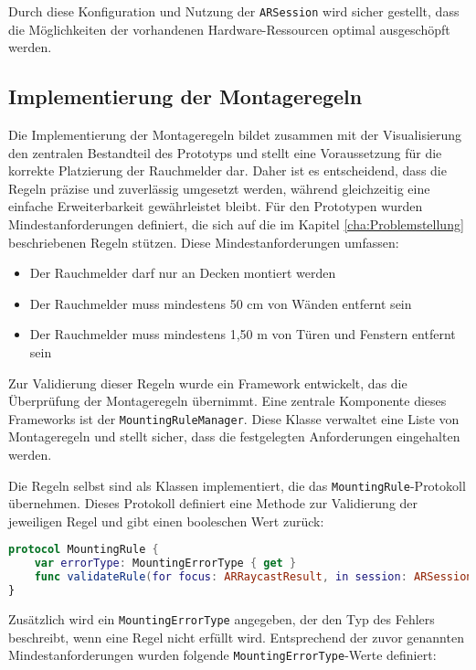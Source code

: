 Durch diese Konfiguration und Nutzung der \texttt{ARSession} wird sicher gestellt, dass die Möglichkeiten der vorhandenen Hardware-Ressourcen optimal ausgeschöpft werden.

\subsection{Implementierung der Montageregeln}\label{sec:ImplMontageregeln}

Die Implementierung der Montageregeln bildet zusammen mit der Visualisierung den zentralen Bestandteil des Prototyps und stellt eine Voraussetzung für die korrekte Platzierung der Rauchmelder dar. Daher ist es entscheidend, dass die Regeln präzise und zuverlässig umgesetzt werden, während gleichzeitig eine einfache Erweiterbarkeit gewährleistet bleibt. Für den Prototypen wurden Mindestanforderungen definiert, die sich auf die im Kapitel \ref{cha:Problemstellung} beschriebenen Regeln stützen. Diese Mindestanforderungen umfassen:

\begin{itemize}
    \item Der Rauchmelder darf nur an Decken montiert werden
    \item Der Rauchmelder muss mindestens 50 cm von Wänden entfernt sein
    \item Der Rauchmelder muss mindestens 1,50 m von Türen und Fenstern entfernt sein
\end{itemize}

Zur Validierung dieser Regeln wurde ein Framework entwickelt, das die Überprüfung der Montageregeln übernimmt. Eine zentrale Komponente dieses Frameworks ist der \texttt{MountingRuleManager}. Diese Klasse verwaltet eine Liste von Montageregeln und stellt sicher, dass die festgelegten Anforderungen eingehalten werden.

Die Regeln selbst sind als Klassen implementiert, die das \texttt{MountingRule}-Protokoll übernehmen. Dieses Protokoll definiert eine Methode zur Validierung der jeweiligen Regel und gibt einen booleschen Wert zurück:

\begin{lstlisting}[language=Swift]
protocol MountingRule {
    var errorType: MountingErrorType { get }
    func validateRule(for focus: ARRaycastResult, in session: ARSession) async -> Bool
}
\end{lstlisting}

Zusätzlich wird ein \texttt{MountingErrorType} angegeben, der den Typ des Fehlers beschreibt, wenn eine Regel nicht erfüllt wird. Entsprechend der zuvor genannten Mindestanforderungen wurden folgende \texttt{MountingErrorType}-Werte definiert:

